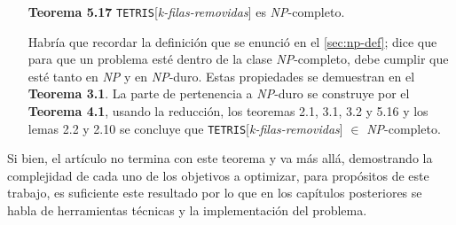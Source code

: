 \begin{itemize}[leftmargin=0.5cm,align=left]
El artículo, va un poco más allá y plantea, discute y demuestra la propiedad
de que la robustez o exactitud\footnote{Viene del inglés \textit{soundness}.},
que significa que cualquier solución encontrada sea correcta.

Inmediatamente después de esta última demostración, el artículo enuncia como
consecuencia a todos los teoremas y lemas enunciados arriba, el siguiente
teorema:

\item[\textbf{Teorema 5.17}] \texttt{TETRIS}[\textit{k-filas-removidas}] es \textsl{NP}-completo.

Habría que recordar la definición que se enunció en el \cref{sec:np-def}; dice
que para que un problema esté dentro de la clase \textsl{NP}-completo, debe cumplir
que esté tanto en \textsl{NP} y en \textsl{NP}-duro. Estas propiedades se demuestran
en el \textbf{Teorema 3.1}. La parte de pertenencia a \textsl{NP}-duro se construye
por el \textbf{Teorema 4.1}, usando la reducción, los teoremas 2.1, 3.1, 3.2 y
5.16 y los lemas 2.2 y 2.10 se concluye que
\texttt{TETRIS}[\textit{k-filas-removidas}] $\in$ \textsl{NP}-completo.

\end{itemize}

Si bien, el artículo no termina con este teorema y va más allá, demostrando la
complejidad de cada uno de los objetivos a optimizar, para propósitos de este
trabajo, es suficiente este resultado por lo que en los capítulos posteriores
se habla de herramientas técnicas y la implementación del problema.

